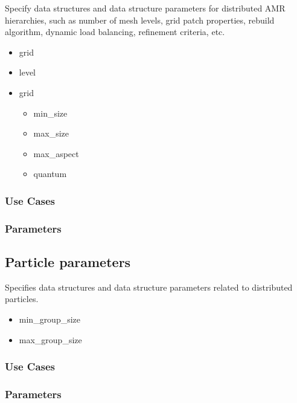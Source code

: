 Specify data structures and data structure parameters for distributed
AMR hierarchies, such as number of mesh levels, grid patch properties,
rebuild algorithm, dynamic load balancing, refinement criteria, etc.

\begin{itemize}
\item grid
\item level
\item grid
\begin{itemize}
\item min\_size
\item max\_size
\item max\_aspect
\item quantum
\end{itemize}
\end{itemize}


\subsubsection{Use Cases}
\subsubsection{Parameters}


\subsection{Particle parameters} \label{ss:params-particles}

Specifies data structures and data structure parameters related
to distributed particles.  

\begin{itemize}
\item min\_group\_size
\item max\_group\_size
\end{itemize}


\subsubsection{Use Cases}
\subsubsection{Parameters}


